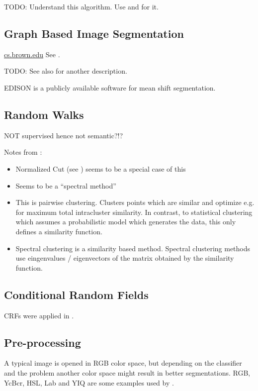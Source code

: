 TODO: Understand this algorithm. Use \cite{comaniciu2002mean} and
\cite{pantofaru2005comparison} for it.


\subsection{Graph Based Image Segmentation}\label{subsec:graph-based-image-segmentation}
\href{http://cs.brown.edu/~pff/segment/}{cs.brown.edu}
See \cite{felzenszwalb2004efficient}.

TODO: See also \cite{pantofaru2005comparison} for another description.

EDISON is a publicly available software for mean shift segmentation.\cite{christoudias2002synergism}


\subsection{Random Walks}
NOT supervised hence not semantic?!?

Notes from \cite{meilpa2001learning}:

\begin{itemize}
    \item Normalized Cut (see \cite{shi2000normalized}) seems to be a special
          case of this
    \item Seems to be a \enquote{spectral method}
    \item This is pairwise clustering. Clusters points which are similar and
          optimize e.g. for maximum total intracluster similarity. In contrast,
          to statistical clustering which assumes a probabilistic model which
          generates the data, this only defines a similarity function.
    \item Spectral clustering is a similarity based method. Spectral clustering
          methods use eingenvalues / eigenvectors of the matrix obtained by the
          similarity function.
\end{itemize}


\subsection{Conditional Random Fields}
\Glspl{CRF} were applied in \cite{shotton2006textonboost}.

\subsection{Pre-processing}\label{subsec:preprocessing}
A typical image is opened in RGB color space, but depending on the classifier
and the problem another color space might result in better segmentations. RGB,
YcBcr, HSL, Lab and YIQ are some examples used by \cite{cohen2015memory}.

